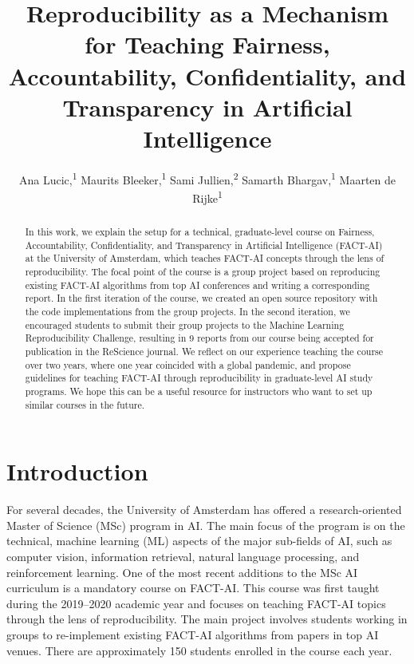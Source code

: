 \documentclass[letterpaper]{article}
\title{Reproducibility as a Mechanism for Teaching Fairness, Accountability, Confidentiality, and Transparency in Artificial Intelligence}
\author {
    Ana Lucic,\equalcontrib{}\textsuperscript{\rm 1}
    Maurits Bleeker,\equalcontrib{}\textsuperscript{\rm 1}
    Sami Jullien,\textsuperscript{\rm 2}
    Samarth Bhargav,\textsuperscript{\rm 1}
    Maarten de Rijke\textsuperscript{\rm 1}
}
\newcommand{\OurUniversity}{the University of Amsterdam}
\begin{document}
\maketitle

\begin{abstract}
In this work, we explain the setup for a technical, graduate-level course on Fairness, Accountability, Confidentiality, and Transparency in Artificial Intelligence (FACT-AI) at \OurUniversity{}, which teaches FACT-AI concepts through the lens of reproducibility.
The focal point of the course is a group project based on reproducing existing FACT-AI algorithms from top AI conferences and writing a corresponding report.
In the first iteration of the course, we created an open source repository with the code implementations from the group projects.
In the second iteration, we encouraged students to submit their group projects to the Machine Learning Reproducibility Challenge, resulting in 9 reports from our course being accepted for publication in the ReScience journal.
We reflect on our experience teaching the course over two years, where one year coincided with a global pandemic, and propose guidelines for teaching FACT-AI through reproducibility in graduate-level AI study programs.
We hope this can be a useful resource for instructors who want to set up similar courses in the future.
\end{abstract}









\fi

\section{Introduction}
\label{section:introduction}

For several decades, \OurUniversity{} has offered a research-oriented Master of Science (MSc) program in \acf{AI}.
The main focus of the program is on the technical, machine learning (ML) aspects of the major sub-fields of \ac{AI}, such as computer vision, information retrieval, natural language processing, and reinforcement learning.
One of the most recent additions to the MSc AI curriculum is a mandatory course on \ac{FACT-AI}.
This course was first taught during the 2019--2020 academic year and focuses on teaching FACT-AI topics through the lens of reproducibility.
The main project involves students working in groups to re-implement existing FACT-AI algorithms from papers in top AI venues.
There are approximately 150 students enrolled in the course each year.
\end{document}
